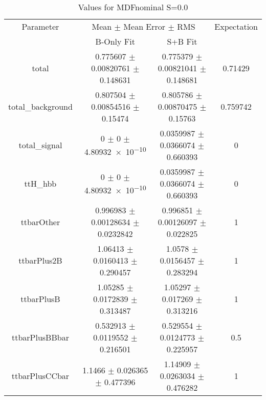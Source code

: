 \begin{table}
\centering
\caption{Values for MDFnominal S=0.0}
\begin{tabular}{cccc}
\toprule
Parameter & \multicolumn{2}{c}{Mean $\pm$ Mean Error $\pm$ RMS} & Expectation\\
 & B-Only Fit & S+B Fit & \\
\midrule
total & \num{0.775607} $\pm$ \num{0.00820761} $\pm$ \num{0.148631} & \num{0.775379} $\pm$ \num{0.00821041} $\pm$ \num{0.148681} & \num{0.71429}\\
total\_background & \num{0.807504} $\pm$ \num{0.00854516} $\pm$ \num{0.15474} & \num{0.805786} $\pm$ \num{0.00870475} $\pm$ \num{0.15763} & \num{0.759742}\\
total\_signal & \num{0} $\pm$ \num{0} $\pm$ \num{4.80932e-10} & \num{0.0359987} $\pm$ \num{0.0366074} $\pm$ \num{0.660393} & \num{0}\\
ttH\_hbb & \num{0} $\pm$ \num{0} $\pm$ \num{4.80932e-10} & \num{0.0359987} $\pm$ \num{0.0366074} $\pm$ \num{0.660393} & \num{0}\\
ttbarOther & \num{0.996983} $\pm$ \num{0.00128634} $\pm$ \num{0.0232842} & \num{0.996851} $\pm$ \num{0.00126097} $\pm$ \num{0.022825} & \num{1}\\
ttbarPlus2B & \num{1.06413} $\pm$ \num{0.0160413} $\pm$ \num{0.290457} & \num{1.0578} $\pm$ \num{0.0156457} $\pm$ \num{0.283294} & \num{1}\\
ttbarPlusB & \num{1.05285} $\pm$ \num{0.0172839} $\pm$ \num{0.313487} & \num{1.05297} $\pm$ \num{0.017269} $\pm$ \num{0.313216} & \num{1}\\
ttbarPlusBBbar & \num{0.532913} $\pm$ \num{0.0119552} $\pm$ \num{0.216501} & \num{0.529554} $\pm$ \num{0.0124773} $\pm$ \num{0.225957} & \num{0.5}\\
ttbarPlusCCbar & \num{1.1466} $\pm$ \num{0.026365} $\pm$ \num{0.477396} & \num{1.14909} $\pm$ \num{0.0263034} $\pm$ \num{0.476282} & \num{1}\\
\bottomrule
\end{tabular}
\end{table}